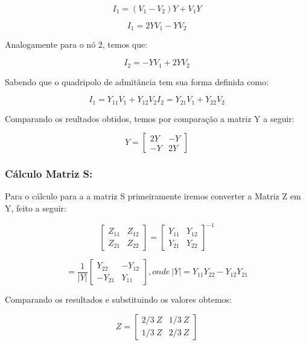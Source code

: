 \documentclass[a4paper,12pt]{proc}
\begin{document}
\[I_{1} = (V_{1} - V_{2})Y + V_{1}Y\]

\[I_{1} = 2YV_{1} - YV_{2}\]

\noindent Analogamente para o nó 2, temos que:

\[I_{2} = -YV_{1} + 2YV_{2}\]

\noindent Sabendo que o quadripolo de admitância tem sua forma definida como:

\begin{subequations}
    \label{eqn8}
    \begin{equation}
        \label{eqn8:1}
        I_{1} = Y_{11}V_{1} + Y_{12}V_{2}
    \end{equation}

    \begin{equation}
        \label{eqn8:2}
        I_{2} = Y_{21}V_{1} + Y_{22}V_{2}
    \end{equation}
\end{subequations}

\noindent Comparando os reultados obtidos, temos por comparação a matriz Y a seguir:

\[Y = \begin{bmatrix} 2Y & -Y \\ -Y & 2Y \end{bmatrix}\]

\subsubsection{Cálculo Matriz S:}

Para o cálculo para a a matriz S primeiramente iremos converter a Matriz Z em Y, feito a seguir:

\[\begin{bmatrix} Z_{11} & Z_{12} \\ Z_{21} & Z_{22} \end{bmatrix} = \begin{bmatrix} Y_{11} & Y_{12} \\ Y_{21} & Y_{22} \end{bmatrix}^{-1}\]

\[= \frac{1}{\left | Y \right |}\begin{bmatrix} Y_{22} & -Y_{12} \\ -Y_{21} & Y_{11} \end{bmatrix}, onde~ \left | Y \right | = Y_{11}Y_{22}-Y_{12}Y_{21}\]

\noindent Comparando os resultados e substituindo os valores obtemos:

\[Z = \begin{bmatrix} 2/3~Z & 1/3~Z\\ 1/3~Z & 2/3~Z \end{bmatrix}\]
\end{document}
